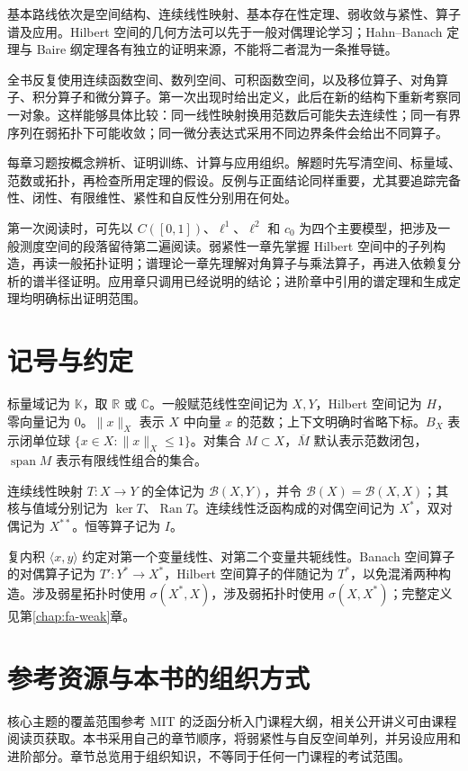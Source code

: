 \documentclass[UTF8,12pt,a4paper,fontset=fandol]{ctexbook}
\begin{document}
基本路线依次是空间结构、连续线性映射、基本存在性定理、弱收敛与紧性、算子谱及应用。Hilbert 空间的几何方法可以先于一般对偶理论学习；Hahn--Banach 定理与 Baire 纲定理各有独立的证明来源，不能将二者混为一条推导链。

全书反复使用连续函数空间、数列空间、可积函数空间，以及移位算子、对角算子、积分算子和微分算子。第一次出现时给出定义，此后在新的结构下重新考察同一对象。这样能够具体比较：同一线性映射换用范数后可能失去连续性；同一有界序列在弱拓扑下可能收敛；同一微分表达式采用不同边界条件会给出不同算子。

每章习题按概念辨析、证明训练、计算与应用组织。解题时先写清空间、标量域、范数或拓扑，再检查所用定理的假设。反例与正面结论同样重要，尤其要追踪完备性、闭性、有限维性、紧性和自反性分别用在何处。

第一次阅读时，可先以 $C([0,1])$、$\ell^1$、$\ell^2$ 和 $c_0$ 为四个主要模型，把涉及一般测度空间的段落留待第二遍阅读。弱紧性一章先掌握 Hilbert 空间中的子列构造，再读一般拓扑证明；谱理论一章先理解对角算子与乘法算子，再进入依赖复分析的谱半径证明。应用章只调用已经说明的结论；进阶章中引用的谱定理和生成定理均明确标出证明范围。

\section{记号与约定}

标量域记为 $\mathbb K$，取 $\mathbb R$ 或 $\mathbb C$。一般赋范线性空间记为 $X,Y$，Hilbert 空间记为 $H$，零向量记为 $0$。$\|x\|_X$ 表示 $X$ 中向量 $x$ 的范数；上下文明确时省略下标。$B_X$ 表示闭单位球 $\{x\in X:\|x\|_X\leq 1\}$。对集合 $M\subset X$，$\overline M$ 默认表示范数闭包，$\operatorname{span}M$ 表示有限线性组合的集合。

连续线性映射 $T:X\to Y$ 的全体记为 $\mathcal B(X,Y)$，并令 $\mathcal B(X)=\mathcal B(X,X)$；其核与值域分别记为 $\ker T$、$\operatorname{Ran}T$。连续线性泛函构成的对偶空间记为 $X^*$，双对偶记为 $X^{**}$。恒等算子记为 $I$。

复内积 $\langle x,y\rangle$ 约定对第一个变量线性、对第二个变量共轭线性。Banach 空间算子的对偶算子记为 $T':Y^*\to X^*$，Hilbert 空间算子的伴随记为 $T^*$，以免混淆两种构造。涉及弱星拓扑时使用 $\sigma(X^*,X)$，涉及弱拓扑时使用 $\sigma(X,X^*)$；完整定义见第\ref{chap:fa-weak}章。

\section{参考资源与本书的组织方式}

核心主题的覆盖范围参考 MIT 的泛函分析入门课程大纲\cite{mit-syllabus}，相关公开讲义可由课程阅读页\cite{mit-notes}获取。本书采用自己的章节顺序，将弱紧性与自反空间单列，并另设应用和进阶部分。章节总览用于组织知识，不等同于任何一门课程的考试范围。
\end{document}
